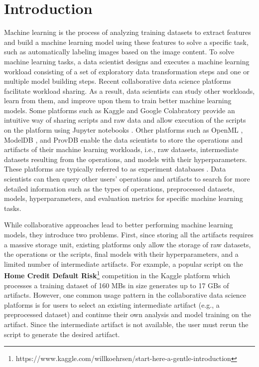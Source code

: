 \section{Introduction} \label{sec-introduction}
Machine learning is the process of analyzing training datasets to extract features and build a machine learning model using these features to solve a specific task, such as automatically labeling images based on the image content.
To solve machine learning tasks, a data scientist designs and executes a machine learning workload consisting of a set of exploratory data transformation steps and one or multiple model building steps.
Recent collaborative data science platforms facilitate workload sharing.
As a result, data scientists can study other workloads, learn from them, and improve upon them to train better machine learning models.
Some platforms such as Kaggle \cite{kagglewebsite} and Google Colabratory \cite{googlecolab} provide an intuitive way of sharing scripts and raw data and allow execution of the scripts on the platform using Jupyter notebooks \cite{Kluyver:2016aa}. 
Other platforms such as OpenML \cite{vanschoren2014openml}, ModelDB \cite{vartak2016m}, and ProvDB \cite{miao2018provdb} enable the data scientists to store the operations and artifacts of their machine learning workloads, i.e., raw datasets, intermediate datasets resulting from the operations, and models with their hyperparameters.
These platforms are typically referred to as experiment databases \cite{Vanschoren2012}.
Data scientists can then query other users' operations and artifacts to search for more detailed information such as the types of operations, preprocessed datasets, models, hyperparameters, and evaluation metrics for specific machine learning tasks.

While collaborative approaches lead to better performing machine learning models, they introduce two problems.
First, since storing all the artifacts requires a massive storage unit, existing platforms only allow the storage of raw datasets, the operations or the scripts, final models with their hyperparameters, and a limited number of intermediate artifacts.
For example, a popular script on the \textbf{Home Credit Default Risk}\footnote{https://www.kaggle.com/willkoehrsen/start-here-a-gentle-introduction} competition in the Kaggle platform which processes a training dataset of 160 MBs in size generates up to 17 GBs of artifacts.
However, one common usage pattern in the collaborative data science platforms is for users to select an existing intermediate artifact (e.g., a preprocessed dataset) and continue their own analysis and model training on the artifact. 
Since the intermediate artifact is not available, the user must rerun the script to generate the desired artifact.

